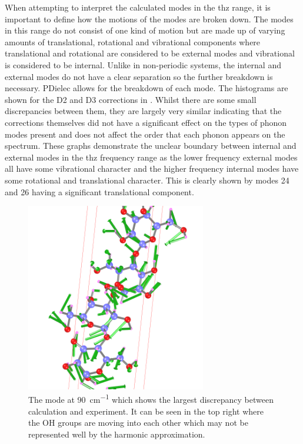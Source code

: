 When attempting to interpret the calculated modes in the \acrshort{thz} range, it is important to define how the motions of the modes are broken down. The modes in this range do not consist of one kind of motion but are made up of varying amounts of translational, rotational and vibrational components where translational and rotational are considered to be external modes and vibrational is considered to be internal. Unlike in non-periodic systems, the internal and external modes do not have a clear separation \cite{Jepsen2007} so the further breakdown is necessary. PDielec allows for the breakdown of each mode. The histograms are shown for the D2 and D3 corrections in . Whilst there are some small discrepancies between them, they are largely very similar indicating that the corrections themselves did not have a significant effect on the types of phonon modes present and does not affect the order that each phonon appears on the spectrum. These graphs demonstrate the unclear boundary between internal and external modes in the \acrshort{thz} frequency range as the lower frequency external modes all have some vibrational character and the higher frequency internal modes have some rotational and translational character. This is clearly shown by modes 24 and 26 having a significant translational component.

\begin{figure}[t]
    \centering
    \includegraphics[width=0.7\textwidth]{Figures/Analysis/IVDW/mode13.png}
    \captionsetup{font = footnotesize, justification = centering}
    \caption[The Mode which shows the Largest Discrepancy between Calculation and Experiment]{The mode at \SI{90}{cm^{-1}} which shows the largest discrepancy between calculation and experiment. It can be seen in the top right where the OH groups are moving into each other which may not be represented well by the harmonic approximation.}
    \label{fig:mode13_anharm}
\end{figure}

